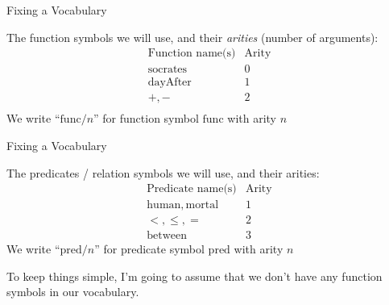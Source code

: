 \documentclass[xetex,aspectratio=169,14pt,hyperref={pdfpagelabels=true,pdflang={en-GB}}]{beamer}
\begin{document}
\begin{frame}
  {Fixing a Vocabulary}

  The function symbols we will use, and their \emph{arities}
  (number of arguments):
  \begin{displaymath}
    \begin{array}{l|l}
      \textrm{Function name(s)}&\textrm{Arity}\\
      \hline
      \mathrm{socrates} & 0 \\
      \mathrm{dayAfter} & 1 \\
      +, -              & 2\\
    \end{array}
  \end{displaymath}
  We write ``$\mathrm{func}/n$'' for function symbol $\mathrm{func}$
  with arity $n$
\end{frame}

\begin{frame}
  {Fixing a Vocabulary}

  The predicates / relation symbols we will use, and their arities:
  \begin{displaymath}
    \begin{array}{l|l}
      \textrm{Predicate name(s)}&\textrm{Arity} \\
      \hline
      \mathrm{human}, \mathrm{mortal} & 1 \\
      <, \leq, =                      & 2 \\
      \mathrm{between}                & 3
    \end{array}
  \end{displaymath}
  We write ``$\mathrm{pred}/n$'' for predicate symbol
  $\mathrm{pred}$ with arity $n$
\end{frame}

\begin{frame}

  \bigskip

  To keep things simple, I'm going to assume that we don't have any
  function symbols in our vocabulary.
\end{frame}
\end{document}
